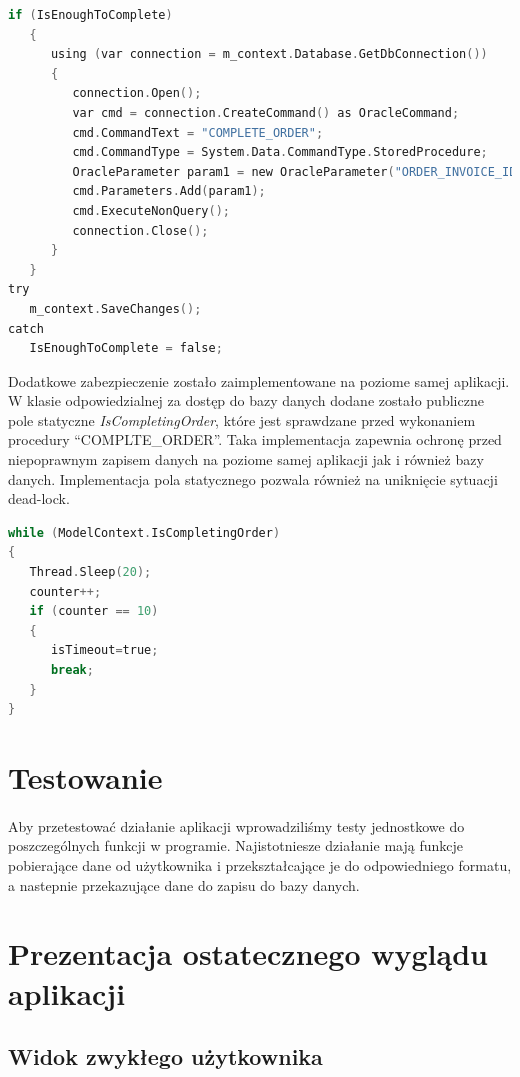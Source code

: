 \documentclass{article}
\begin{document}
\begin{lstlisting}[language=C, frame=single,tabsize=1,caption={Kod aplikacji wywołujący procedurę COMPLETE\_ORDER}]
if (IsEnoughToComplete)
   {
      using (var connection = m_context.Database.GetDbConnection())
      {
         connection.Open();
         var cmd = connection.CreateCommand() as OracleCommand;
         cmd.CommandText = "COMPLETE_ORDER";
         cmd.CommandType = System.Data.CommandType.StoredProcedure;
         OracleParameter param1 = new OracleParameter("ORDER_INVOICE_ID", InvoiceID);
         cmd.Parameters.Add(param1);
         cmd.ExecuteNonQuery();
         connection.Close();
      }
   }
try
   m_context.SaveChanges();
catch
   IsEnoughToComplete = false;
\end{lstlisting}

Dodatkowe zabezpieczenie zostało zaimplementowane na poziome samej aplikacji. W
klasie odpowiedzialnej za dostęp do bazy danych dodane zostało publiczne pole
statyczne \textit{IsCompletingOrder}, które jest sprawdzane przed wykonaniem
procedury ``COMPLTE\_ORDER''. Taka implementacja zapewnia ochronę przed
niepoprawnym zapisem danych na poziome samej aplikacji jak i również bazy
danych. Implementacja pola statycznego pozwala również na uniknięcie sytuacji
dead-lock.
\begin{lstlisting}[language=C,frame=single]
while (ModelContext.IsCompletingOrder)
{
   Thread.Sleep(20);
   counter++;
   if (counter == 10)
   {
      isTimeout=true;
      break;
   }
}
\end{lstlisting}

\section{Testowanie}
\paragraph{}
Aby przetestować działanie aplikacji wprowadziliśmy testy jednostkowe do poszczególnych funkcji w
programie.
Najistotniesze działanie mają funkcje pobierające dane od użytkownika i przekształcające je do
odpowiedniego formatu, a nastepnie przekazujące dane do zapisu do bazy danych.

\section{Prezentacja ostatecznego wyglądu aplikacji}
\subsection{Widok zwykłego użytkownika}
\end{document}
